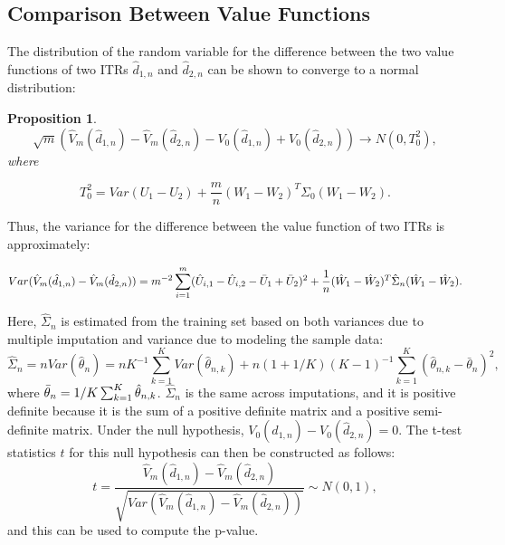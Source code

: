 \documentclass{article}
\newtheorem{proposition}{Proposition}
\begin{document}
\subsection{Comparison Between Value Functions}
The distribution of the random variable for the difference between the two value functions of two ITRs $\hat{d}_{1,n}$ and $\hat{d}_{2,n}$ can be shown to converge to a normal distribution:

\begin{proposition}\label{prop:vvardiff}
\begin{equation}
    \sqrt{m}(\hat{V}_{m}(\hat{d}_{1,n})-\hat{V}_{m}(\hat{d}_{2,n})-V_0(\hat{d}_{1,n})+V_0(\hat{d}_{2,n})) \rightarrow N(0,T_{0}^2),
\end{equation}
where

\begin{equation*}
    T_{0}^2=Var(U_1-U_2)
    +\frac{m}{n}(W_{1}-W_{2})^T \Sigma_{0}(W_{1}-W_{2}).
\end{equation*}
\end{proposition}

Thus, the variance for the difference between the value function of two ITRs is approximately:

\begin{equation}\label{eq:estvardiff}
    Var(\hat{V}_{m}(\hat{d}_{1,n})-\hat{V}_{m}(\hat{d}_{2,n}))=m^{-2}\sum_{i=1}^{m}(\hat{U}_{i,1}-\hat{U}_{i,2}-\Bar{U}_{1}+\Bar{U}_{2})^2+\frac{1}{n}(\hat{W}_{1}-\hat{W}_{2})^T\hat{\Sigma}_{n}(\hat{W}_{1}-\hat{W}_{2}).
\end{equation}

Here, $\hat{\Sigma}_{n}$ is estimated from the training set based on both variances due to multiple imputation and variance due to modeling the sample data:
\begin{equation*}
    \hat{\Sigma}_n = nVar(\hat{\theta}_n) = nK^{-1}\sum_{k=1}^K Var(\hat{\theta}_{n,k})+n(1+1/K)(K-1)^{-1}\sum_{k=1}^K(\hat{\theta}_{n,k}-\bar{\theta}_{n})^2,
\end{equation*}
where $\Bar{\theta}_{n}=1/K \sum_{k=1}^K \hat{\theta}_{n,k}$. $\hat{\Sigma}_{n}$ is the same across imputations, and it is positive definite because it is the sum of a positive definite matrix and a positive semi-definite matrix. 
Under the null hypothesis, $V_0(\hat{d}_{1,n})-V_0(\hat{d}_{2,n})=0$. The t-test statistics $t$ for this null hypothesis can then be constructed as follows:
\begin{equation}\label{eq:ttest}
t = \frac{\hat{V}_{m}(\hat{d}_{1,n})-\hat{V}_{m}(\hat{d}_{2,n})}{\sqrt{Var(\hat{V}_m(\hat{d}_{1,n})-\hat{V}_m(\hat{d}_{2,n}))}} \sim N(0,1),
\end{equation}
and this can be used to compute the p-value.
\end{document}
